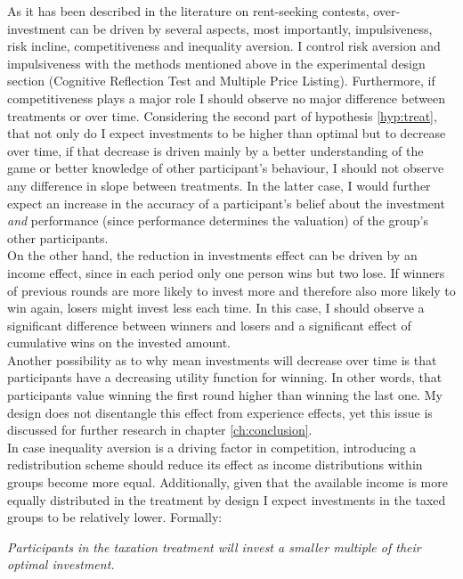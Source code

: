     As it has been described in the literature on rent-seeking contests, over-investment can be driven by several aspects, most importantly, impulsiveness, risk incline, competitiveness and inequality aversion. I control risk aversion and impulsiveness with the methods mentioned above in the experimental design section (Cognitive Reflection Test and Multiple Price Listing). Furthermore, if competitiveness plays a major role I should observe no major difference between treatments or over time. Considering the second part of hypothesis \ref{hyp:treat}, that not only do I expect investments to be higher than optimal but to decrease over time, if that decrease is driven mainly by a better understanding of the game or better knowledge of other participant's behaviour, I should not observe any difference in slope between treatments. In the latter case, I would further expect an increase in the accuracy of a participant's belief about the investment \textit{and} performance (since performance determines the valuation) of the group's other participants.\\
    
    On the other hand, the reduction in investments effect can be driven by an income effect, since in each period only one person wins but two lose. If winners of previous rounds are more likely to invest more and therefore also more likely to win again, losers might invest less each time.  In this case, I should observe a significant difference between winners and losers and a significant effect of cumulative wins on the invested amount.\\
    
    Another possibility as to why mean investments will decrease over time is that participants have a decreasing utility function for winning. In other words, that participants value winning the first round higher than winning the last one. My design does not disentangle this effect from experience effects, yet this issue is discussed for further research in chapter \ref{ch:conclusion}.\\
    
    In case inequality aversion is a driving factor in competition, introducing a redistribution scheme should reduce its effect as income distributions within groups become more equal. Additionally, given that the available income is more equally distributed in the treatment by design I expect investments in the taxed groups to be relatively lower. Formally:
    
    \begin{hyp} \label{hyp:treat-overinvest}
    \textit{Participants in the taxation treatment will invest a smaller multiple of their optimal investment.}
    \end{hyp}
    
